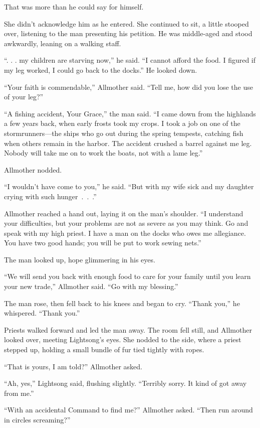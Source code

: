 That was more than he could say for himself.

She didn’t acknowledge him as he entered. She continued to sit, a little stooped over, listening to the man presenting his petition. He was middle-aged and stood awkwardly, leaning on a walking staff.

“. . . my children are starving now,” he said. “I cannot afford the food. I figured if my leg worked, I could go back to the docks.” He looked down.

“Your faith is commendable,” Allmother said. “Tell me, how did you lose the use of your leg?”

“A fishing accident, Your Grace,” the man said. “I came down from the highlands a few years back, when early frosts took my crops. I took a job on one of the stormrunners—the ships who go out during the spring tempests, catching fish when others remain in the harbor. The accident crushed a barrel against me leg. Nobody will take me on to work the boats, not with a lame leg.”

Allmother nodded.

“I wouldn’t have come to you,” he said. “But with my wife sick and my daughter crying with such hunger~.~.~.”

Allmother reached a hand out, laying it on the man’s shoulder. “I understand your difficulties, but your problems are not as severe as you may think. Go and speak with my high priest. I have a man on the docks who owes me allegiance. You have two good hands; you will be put to work sewing nets.”

The man looked up, hope glimmering in his eyes.

“We will send you back with enough food to care for your family until you learn your new trade,” Allmother said. “Go with my blessing.”

The man rose, then fell back to his knees and began to cry. “Thank you,” he whispered. “Thank you.”

Priests walked forward and led the man away. The room fell still, and Allmother looked over, meeting Lightsong’s eyes. She nodded to the side, where a priest stepped up, holding a small bundle of fur tied tightly with ropes.

“That is yours, I am told?” Allmother asked.

“Ah, yes,” Lightsong said, flushing slightly. “Terribly sorry. It kind of got away from me.”

“With an accidental Command to find me?” Allmother asked. “Then run around in circles screaming?”

